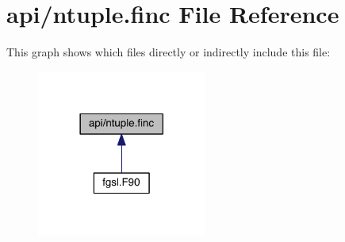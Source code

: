 \hypertarget{ntuple_8finc}{\section{api/ntuple.finc File Reference}
\label{ntuple_8finc}
}
This graph shows which files directly or indirectly include this file\-:\nopagebreak
\begin{figure}[H]
\begin{center}
\leavevmode
\includegraphics[width=158pt]{ntuple_8finc__dep__incl}
\end{center}
\end{figure}
